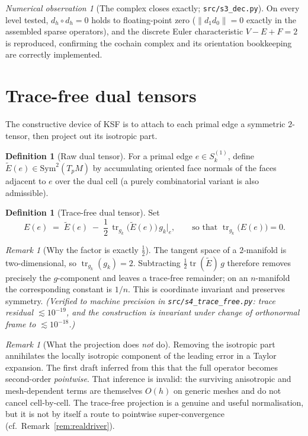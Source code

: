 \documentclass[11pt]{article}
\theoremstyle{plain}
\theoremstyle{definition}
\newtheorem{definition}[theorem]{Definition}
\theoremstyle{remark}
\newtheorem{remark}[theorem]{Remark}
\newtheorem{observation}[theorem]{Numerical observation}
\newcommand{\tr}{\operatorname{tr}}
\newcommand{\Sym}{\mathrm{Sym}}
\newcommand{\dext}{d_h}
\newcommand{\norm}[1]{\left\lVert #1 \right\rVert}
\newcommand{\Order}{O}
\begin{document}
\begin{observation}[The complex closes exactly; \texttt{src/s3\_dec.py}]
\label{obs:s3}
On every level tested, $\dext\circ\dext=0$ holds to floating-point zero
($\norm{d_1 d_0}=0$ exactly in the assembled sparse operators), and the discrete
Euler characteristic $V-E+F=2$ is reproduced, confirming the cochain complex and
its orientation bookkeeping are correctly implemented.
\end{observation}

\section{Trace-free dual tensors}
\label{sec:tracefree}
The constructive device of KSF is to attach to each primal edge a symmetric
$2$-tensor, then project out its isotropic part.

\begin{definition}[Raw dual tensor]
For a primal edge $e\in S_k^{(1)}$, define $\widetilde{E}(e)\in\Sym^2(T_pM)$ by
accumulating oriented face normals of the faces adjacent to $e$ over the dual
cell (a purely combinatorial variant is also admissible).
\end{definition}

\begin{definition}[Trace-free dual tensor]
\label{def:tracefree}
Set
\[
E(e) \;=\; \widetilde{E}(e) \;-\; \frac{1}{2}\,\tr_{g_k}\!\bigl(\widetilde{E}(e)\bigr)\, g_k|_e,
\qquad\text{so that } \tr_{g_k}\bigl(E(e)\bigr)=0 .
\]
\end{definition}

\begin{remark}[Why the factor is exactly $\tfrac12$]
The tangent space of a $2$-manifold is two-dimensional, so $\tr_{g_k}(g_k)=2$.
Subtracting $\frac{1}{2}\tr(\widetilde{E})\,g$ therefore removes precisely the
$g$-component and leaves a trace-free remainder; on an $n$-manifold the
corresponding constant is $1/n$. This is coordinate invariant and preserves
symmetry. \emph{(Verified to machine precision in \texttt{src/s4\_trace\_free.py}:
trace residual $\lesssim 10^{-19}$, and the construction is invariant under
change of orthonormal frame to $\lesssim 10^{-18}$.)}
\end{remark}

\begin{remark}[What the projection does \emph{not} do]
\label{rem:notdo}
Removing the isotropic part annihilates the locally isotropic component of the
leading error in a Taylor expansion. The first draft inferred from this that the
full operator becomes second-order \emph{pointwise}. That inference is invalid:
the surviving anisotropic and mesh-dependent terms are themselves $\Order(h)$ on
generic meshes and do not cancel cell-by-cell. The trace-free projection is a
genuine and useful normalisation, but it is not by itself a route to pointwise
super-convergence (cf.\ Remark~\ref{rem:realdriver}).
\end{remark}
\end{document}
